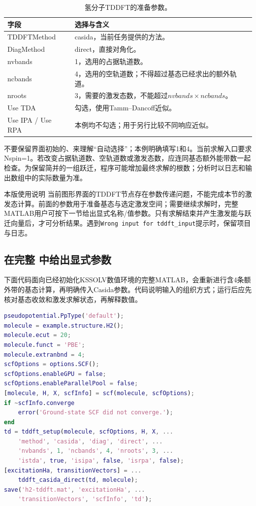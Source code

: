 \begin{table}[htbp]
\centering
\caption{氢分子TDDFT的准备参数。}
\begin{tabularx}{\linewidth}{lX}
\toprule
字段 & 选择与含义 \\
\midrule
TDDFTMethod & casida，当前任务提供的方法。 \\
DiagMethod & direct，直接对角化。 \\
nvbands & 1，选用的占据轨道数。 \\
ncbands & 4，选用的空轨道数；不得超过基态已经求出的额外轨道。 \\
nroots & 3，需要的激发态数，不能超过$nvbands\times ncbands$。 \\
Use TDA & 勾选，使用Tamm--Dancoff近似。 \\
Use IPA / Use RPA & 本例均不勾选；用于另行比较不同响应近似。 \\
\bottomrule
\end{tabularx}
\end{table}

不要保留界面初始的、来理解“自动选择”；本例明确填写1和4。当前求解入口要求Nspin=1。若改变占据轨道数、空轨道数或激发态数，应连同基态额外能带数一起检查。为保留简并的一组跃迁，程序可能增加最终求解的根数；分析时以日志和输出数组中的实际数量为准。

\begin{notebox}{本版使用说明}
当前图形界面的TDDFT节点存在参数传递问题，不能完成本节的激发态计算。前面的参数用于准备基态与选定激发空间；需要继续求解时，完整MATLAB\regmark{}用户可按下一节给出显式名称/值参数。只有求解结束并产生激发能与跃迁向量后，才可分析结果。遇到\texttt{Wrong input for tddft\_input}提示时，保留项目与日志。
\end{notebox}

\subsection{在完整 \regmark{} 中给出显式参数}

下面代码面向已经初始化KSSOLV数值环境的完整MATLAB\regmark{}，会重新进行含4条额外带的基态计算，再明确传入Casida参数。代码说明输入的组织方式；运行后应先核对基态收敛和激发求解状态，再解释数值。

\noindent\begin{minipage}{\linewidth}
\begin{lstlisting}[language=Matlab]
pseudopotential.PpType('default');
molecule = example.structure.H2();
molecule.ecut = 20;
molecule.funct = 'PBE';
molecule.extranbnd = 4;
scfOptions = options.SCF();
scfOptions.enableGPU = false;
scfOptions.enableParallelPool = false;
[molecule, H, X, scfInfo] = scf(molecule, scfOptions);
if ~scfInfo.converge
    error('Ground-state SCF did not converge.');
end
td = tddft_setup(molecule, scfOptions, H, X, ...
    'method', 'casida', 'diag', 'direct', ...
    'nvbands', 1, 'ncbands', 4, 'nroots', 3, ...
    'istda', true, 'isipa', false, 'isrpa', false);
[excitationHa, transitionVectors] = ...
    tddft_casida_direct(td, molecule);
save('h2-tddft.mat', 'excitationHa', ...
    'transitionVectors', 'scfInfo', 'td');
\end{lstlisting}
\end{minipage}

